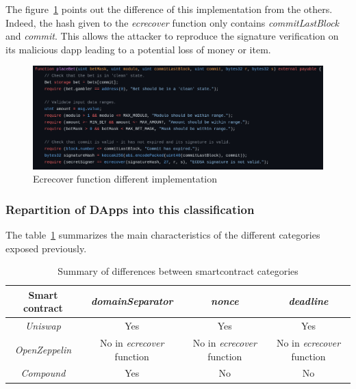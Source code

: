\documentclass{iitFirstPage}
\begin{document}
    The figure~\ref{fig:ecrecover_different} points out the difference of this implementation from the others.
    Indeed, the hash given to the \textit{\gls{ecrecover}} function only contains \textit{commitLastBlock} and \textit{commit}.
    This allows the attacker to reproduce the signature verification on its malicious \Gls{dapp} leading to a potential loss of money or item.

    \begin{figure}[H]
        \centering
        \includegraphics[width=0.9 \linewidth]{ecrecover/ecrecover_function_different}
        \caption{Ecrecover function different implementation}
        \label{fig:ecrecover_different}
    \end{figure}

    \clearpage

    \subsubsection{Repartition of DApps into this classification}

    The table~\ref{tab:comparison-categories} summarizes the main characteristics of the different categories exposed previously.

    \begin{table}[H]
        \begin{center}
            \begin{tabular}{|c||c|c|c|}
                \hline
                \textbf{Smart contract}   & \textbf{\textit{domainSeparator}} & \textbf{\textit{nonce}} & \textbf{\textit{deadline}}\\
                \hline
                \hline
                \textit{Uniswap}   & Yes & Yes & Yes             \\
                \hline
                \textit{OpenZeppelin}    & No in \textit{ecrecover} function    & No in \textit{ecrecover} function   & No in \textit{ecrecover} function   \\
                \hline
                \textit{Compound} &  Yes & No & No             \\
                \hline
            \end{tabular}
        \end{center}
        \caption{Summary of differences between \gls{smartcontract} categories}
        \label{tab:comparison-categories}
    \end{table}
\end{document}
